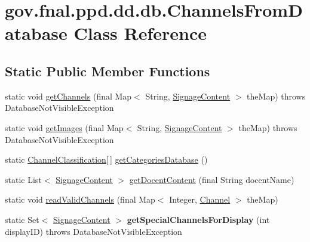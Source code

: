 \hypertarget{classgov_1_1fnal_1_1ppd_1_1dd_1_1db_1_1ChannelsFromDatabase}{\section{gov.\-fnal.\-ppd.\-dd.\-db.\-Channels\-From\-Database Class Reference}
\label{classgov_1_1fnal_1_1ppd_1_1dd_1_1db_1_1ChannelsFromDatabase}
}
\subsection*{Static Public Member Functions}
\begin{DoxyCompactItemize}
\item 
static void \hyperlink{classgov_1_1fnal_1_1ppd_1_1dd_1_1db_1_1ChannelsFromDatabase_a4f56bc3df86bc166d052a5e1df5be71a}{get\-Channels} (final Map$<$ String, \hyperlink{interfacegov_1_1fnal_1_1ppd_1_1dd_1_1signage_1_1SignageContent}{Signage\-Content} $>$ the\-Map)  throws Database\-Not\-Visible\-Exception 
\item 
static void \hyperlink{classgov_1_1fnal_1_1ppd_1_1dd_1_1db_1_1ChannelsFromDatabase_aaff901450a95798cbb5ed035d2ab3af6}{get\-Images} (final Map$<$ String, \hyperlink{interfacegov_1_1fnal_1_1ppd_1_1dd_1_1signage_1_1SignageContent}{Signage\-Content} $>$ the\-Map)  throws Database\-Not\-Visible\-Exception 
\item 
static \hyperlink{classgov_1_1fnal_1_1ppd_1_1dd_1_1changer_1_1ChannelClassification}{Channel\-Classification}\mbox{[}$\,$\mbox{]} \hyperlink{classgov_1_1fnal_1_1ppd_1_1dd_1_1db_1_1ChannelsFromDatabase_a378b7b3be0eb4f7194b4df3adad1ba82}{get\-Categories\-Database} ()
\item 
static List$<$ \hyperlink{interfacegov_1_1fnal_1_1ppd_1_1dd_1_1signage_1_1SignageContent}{Signage\-Content} $>$ \hyperlink{classgov_1_1fnal_1_1ppd_1_1dd_1_1db_1_1ChannelsFromDatabase_a7a75e0d979b68647f696f9a0ac717d64}{get\-Docent\-Content} (final String docent\-Name)
\item 
static void \hyperlink{classgov_1_1fnal_1_1ppd_1_1dd_1_1db_1_1ChannelsFromDatabase_af16576924537b6cb3ea6f742b3d5cbfb}{read\-Valid\-Channels} (final Map$<$ Integer, \hyperlink{interfacegov_1_1fnal_1_1ppd_1_1dd_1_1signage_1_1Channel}{Channel} $>$ the\-Map)
\item 
\hypertarget{classgov_1_1fnal_1_1ppd_1_1dd_1_1db_1_1ChannelsFromDatabase_a1829d1fc9e948a3b0c3d0cf57d669b38}{static Set$<$ \hyperlink{interfacegov_1_1fnal_1_1ppd_1_1dd_1_1signage_1_1SignageContent}{Signage\-Content} $>$ {\bfseries get\-Special\-Channels\-For\-Display} (int display\-I\-D)  throws Database\-Not\-Visible\-Exception }\label{classgov_1_1fnal_1_1ppd_1_1dd_1_1db_1_1ChannelsFromDatabase_a1829d1fc9e948a3b0c3d0cf57d669b38}

\end{DoxyCompactItemize}


